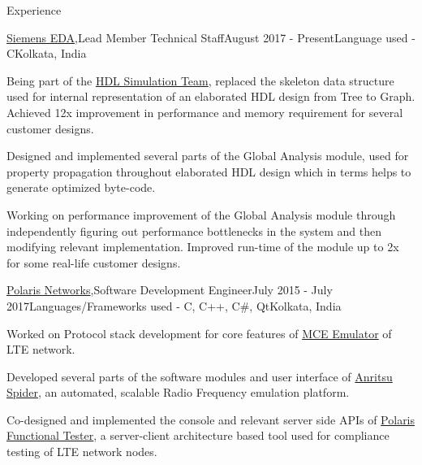 \documentclass{resume}
\begin{document}

\begin{rSection}{Experience}

\begin{rSubsection}{\href{https://mentor.com}{Siemens EDA},}{Lead Member Technical Staff}{August 2017 - Present}{Language used - C}{Kolkata, India}
\item Being part of the \href{https://eda.sw.siemens.com/en-US/ic/questa/simulation/}{HDL Simulation Team}, replaced the skeleton data structure used for internal representation of an elaborated HDL design from Tree to Graph. Achieved 12x improvement in performance and memory requirement for several customer designs.
\item Designed and implemented several parts of the Global Analysis module, used for property propagation throughout elaborated HDL design which in terms helps to generate optimized byte-code.
\item Working on performance improvement of the Global Analysis module through independently figuring out performance bottlenecks in the system and then modifying relevant implementation. Improved run-time of the module up to 2x for some real-life customer designs.
\end{rSubsection}

\begin{rSubsection}{\href{http://www.polarisnetworks.net/}{Polaris Networks},}{Software Development Engineer}{July 2015 - July 2017}{Languages/Frameworks used - C, C++, C\#, Qt}{Kolkata, India}
\item Worked on Protocol stack development for core features of \href{https://polarisnetworks.net/lte_emulators.html}{MCE Emulator} of LTE network.
\item Developed several parts of the software modules and user interface of \href{https://www.anritsu.com/en-us/test-measurement/products/spider}{Anritsu Spider}, an automated, scalable Radio Frequency emulation platform.
\item Co-designed and implemented the console and relevant server side APIs of \href{https://polarisnetworks.net/functional-testers.html}{Polaris Functional Tester}, a server-client architecture based tool used for compliance testing of LTE network nodes.
\end{rSubsection}

\end{rSection}
\end{document}
